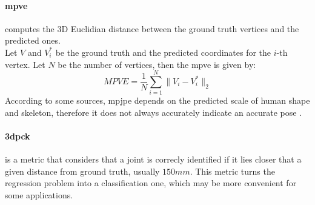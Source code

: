 \documentclass[runningheads]{llncs}
\begin{document}
\paragraph{\ac{mpve}} computes the 3D Euclidian distance between the ground truth vertices and the predicted ones. \\
Let $V$ and $V_i^*$ be the ground truth and the predicted coordinates for the $i$-th vertex. Let $N$ be the number of vertices, then the \ac{mpve} is given by:
\begin{equation}
  MPVE = \frac{1}{N} \sum_{i=1}^N \|V_i - V_i^*\|_2
\end{equation}
According to some sources, \ac{mpjpe} depends on the predicted scale of human shape and skeleton, therefore it does not always accurately indicate an accurate pose \cite{survey}.

\paragraph{\ac{3dpck}} is a metric that considers that a joint is correcly identified if it lies closer that a given distance from ground truth, usually $150mm$. This metric turns the regression problem into a classification one, which may be more convenient for some applications.
\end{document}

